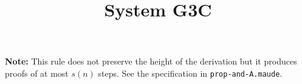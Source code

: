 \documentclass[a4]{article}
\title{System G3C}
\begin{document}
\maketitle

\tableofcontents

\newpage

\newpage

\newpage

\newpage

\newpage

\newpage

\newpage

\newpage

\newpage

\textbf{Note:} This rule does not preserve the height of the derivation but it produces proofs of at most $s(n)$ steps. See the specification in \texttt{prop-and-A.maude}. 
\end{document}
